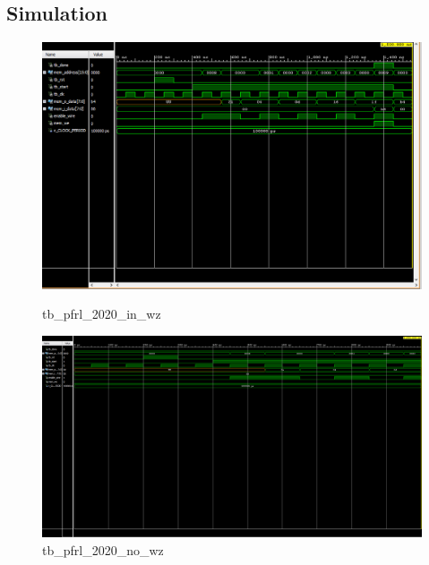 \documentclass[12pt]{article}
\begin{document}
\subsection{Simulation}
\vspace{-0.2 cm}
\begin{figure}[!htb]
    \begin{center}
        \includegraphics[scale=0.45]{in_wz.png}
        \caption{tb\_pfrl\_2020\_in\_wz}
        \vspace{0.2 cm}
        \includegraphics[scale=0.45]{no_wz.png}
        \caption{tb\_pfrl\_2020\_no\_wz}
    \end{center}
\end{figure}
\begin{landscape}
    
\end{landscape}
\end{document}
